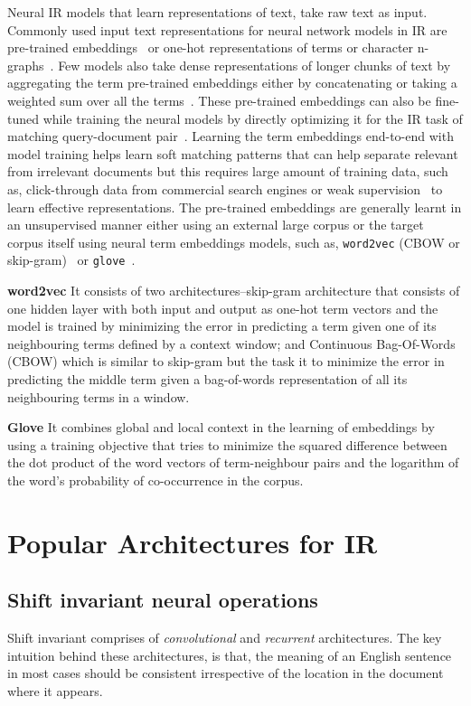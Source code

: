 Neural IR models that learn representations of text, take raw text as input. Commonly used input text representations for neural network models in IR are pre-trained embeddings~\citep{Guo2016, matchpyramid16} or one-hot representations of terms or character n-graphs~\citep{dssm13, Mitra2017a}. Few models also take dense representations of longer chunks of text by aggregating the term pre-trained embeddings either by concatenating or taking a weighted sum over all the terms~\citep{Dehghani_sigir17}. These pre-trained embeddings can also be fine-tuned while training the neural models by directly optimizing it for the IR task of matching query-document pair~\citep{KNRM17}. Learning the term embeddings end-to-end with model training helps learn soft matching patterns that can help separate relevant from irrelevant documents but this requires large amount of training data, such as, click-through data from commercial search engines or weak supervision~\citep{Dehghani_sigir17} to learn effective representations. The pre-trained embeddings are generally learnt in an unsupervised manner either using an external large corpus or the target corpus itself using neural term embeddings models, such as,  \texttt{word2vec} (CBOW or skip-gram)~\citep{Mikolov2013} or \texttt{glove}~\citep{pennington2014glove}.

\textbf{word2vec} It consists of two architectures--\textsf{skip-gram} architecture that consists of one hidden layer with both input and output as one-hot term vectors and the model is trained by minimizing the error in predicting a term given one of its neighbouring terms defined by a context window; and \textsf{Continuous Bag-Of-Words} (CBOW) which is similar to skip-gram but the task it to minimize the error in predicting the middle term given a bag-of-words representation of all its neighbouring terms in a window. 

\textbf{Glove} It combines global and local context in the learning of embeddings by using a training objective that tries to minimize the squared difference between the dot product of the word vectors of term-neighbour pairs and the logarithm of the word's probability of co-occurrence in the corpus.

\section{Popular Architectures for IR}
\label{sec:popular_architectures_for_ir}

\subsection{Shift invariant neural operations}
Shift invariant comprises of \textit{convolutional} and \textit{recurrent} architectures. The key intuition behind these architectures, is that, the meaning of an English sentence in most cases should be consistent irrespective of the location in the document where it appears.

